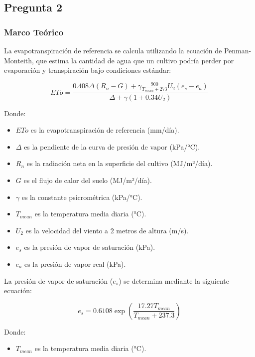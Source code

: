 \documentclass{article}  %
\begin{document}
\subsection{Pregunta 2}

\subsubsection{Marco Teórico}

La evapotranspiración de referencia se calcula utilizando la ecuación de Penman-Monteith, que estima la cantidad de agua que un cultivo podría perder por evaporación y transpiración bajo condiciones estándar:

\begin{equation}
  ETo = \frac{0.408 \Delta (R_n - G) + \gamma \frac{900}{T_{mean} + 273} U_2 (e_s - e_a)}{\Delta + \gamma (1 + 0.34 U_2)}
\end{equation}

Donde:

\begin{itemize}
  \item $ETo$ es la evapotranspiración de referencia (mm/día).
  \item $\Delta$ es la pendiente de la curva de presión de vapor (kPa/°C).
  \item $R_n$ es la radiación neta en la superficie del cultivo (MJ/m²/día).
  \item $G$ es el flujo de calor del suelo (MJ/m²/día).
  \item $\gamma$ es la constante psicrométrica (kPa/°C).
  \item $T_{mean}$ es la temperatura media diaria (°C).
  \item $U_2$ es la velocidad del viento a 2 metros de altura (m/s).
  \item $e_s$ es la presión de vapor de saturación (kPa).
  \item $e_a$ es la presión de vapor real (kPa).
\end{itemize}

La presión de vapor de saturación ($e_s$) se determina mediante la siguiente ecuación:

\begin{equation}
  e_s = 0.6108 \exp \left( \frac{17.27 T_{mean}}{T_{mean} + 237.3} \right)
\end{equation}

Donde:

\begin{itemize}
  \item $T_{mean}$ es la temperatura media diaria (°C).
\end{itemize}
\end{document}
